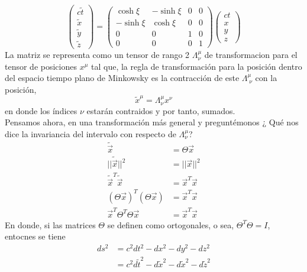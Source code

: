 \documentclass[../main.tex]{subfiles}
\begin{document}
\begin{equation}
  \begin{pmatrix}
    c\tilde{t} \\ \tilde{x} \\ \tilde{{y}} \\ \tilde{z} 
  \end{pmatrix}
   = \begin{pmatrix}
     \cosh{\xi} & - \sinh{\xi} & 0 & 0 \\ -\sinh{\xi} & \cosh{\xi} & 0 & 0 \\ 0 & 0 & 1 & 0 \\ 0 & 0 & 0 & 1 
   \end{pmatrix}
   \begin{pmatrix}
     ct \\ x \\ y \\ z
   \end{pmatrix}
\end{equation}
La matriz se representa como un tensor de rango 2 $\Lambda_\nu^\mu$ de transformacion para el tensor de posiciones $x^\mu$ tal que, la regla de transformación para la posición dentro del espacio tiempo plano de Minkowsky es la contracción de este $\Lambda^\mu_{\; \nu}$ con la posición, 
\begin{equation}
  \tilde{x}^\mu=\Lambda^\mu_\nu x^\nu
\end{equation}
en donde los índices $\nu$ estarán contraidos y por tanto, sumados. \\
Pensamos ahora, en una transformación más general y preguntémonos ¿ Qué nos dice la invariancia del intervalo con respecto de $\Lambda^\mu_\nu$?
\begin{align*}
  \tilde{\vec{x}} &  = \Theta \vec{x} \\
  ||\tilde{\vec{x}}||^2 & = ||\vec{x}||^2 \\
  \tilde{\vec{x}}^T\tilde{\vec{x}} & = \vec{x}^T\vec{x} \\
  (\Theta\vec{x})^T(\Theta\vec{x}) & = \vec{x}^T\vec{x} \\
  \vec{x}^T\Theta^T\Theta\vec{x}   & = \vec{x}^T\vec{x} 
\end{align*}
En donde, si las matrices $\Theta$ se definen como ortogonales, o sea, $\Theta^T\Theta= I$, entocnes se tiene
\begin{align*}
  ds^2  & = c^2dt^2 - dx^2 - dy^2 - dz^2 \\
  & = c^2d\tilde{t}^2 - d\tilde{x}^2 - d\tilde{x}^2 - d\tilde{z}^2
\end{align*}
\end{document}
